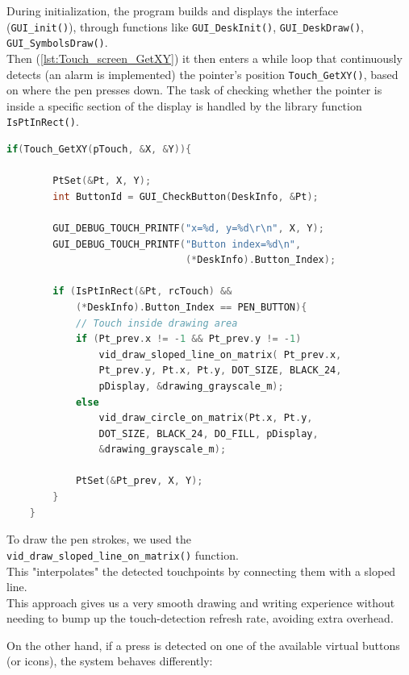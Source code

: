 \newpage
\noindent
During initialization, the program builds and displays the interface \\ (\texttt{GUI\_init()}), through functions like \texttt{GUI\_DeskInit()}, \texttt{GUI\_DeskDraw()}, \\
\texttt{GUI\_SymbolsDraw()}. \\
Then (\autoref{lst:Touch_screen_GetXY}) it then enters a while loop that continuously detects (an alarm is implemented) the pointer's position \texttt{Touch\_GetXY()}, based on where the pen presses down. The task of checking whether the pointer is inside a specific section of the display is handled by the library function  \texttt{IsPtInRect()}. 

\vspace{1em}
\begin{lstlisting}[language=C, caption={Handling the touchscreen}, label={lst:Touch_screen_GetXY}]
    if(Touch_GetXY(pTouch, &X, &Y)){
    
        PtSet(&Pt, X, Y);
        int ButtonId = GUI_CheckButton(DeskInfo, &Pt);
    
        GUI_DEBUG_TOUCH_PRINTF("x=%d, y=%d\r\n", X, Y);
        GUI_DEBUG_TOUCH_PRINTF("Button index=%d\n", 
                               (*DeskInfo).Button_Index);
    
        if (IsPtInRect(&Pt, rcTouch) &&  
            (*DeskInfo).Button_Index == PEN_BUTTON){
            // Touch inside drawing area
            if (Pt_prev.x != -1 && Pt_prev.y != -1)
                vid_draw_sloped_line_on_matrix( Pt_prev.x,
                Pt_prev.y, Pt.x, Pt.y, DOT_SIZE, BLACK_24,
                pDisplay, &drawing_grayscale_m);
            else
                vid_draw_circle_on_matrix(Pt.x, Pt.y,
                DOT_SIZE, BLACK_24, DO_FILL, pDisplay,
                &drawing_grayscale_m);
    
            PtSet(&Pt_prev, X, Y);    
        }
    }
\end{lstlisting}

\noindent
To draw the pen strokes, we used the\\
\texttt{vid\_draw\_sloped\_line\_on\_matrix()} function. \\
This "interpolates" the detected touchpoints by connecting them with a sloped line. \\
This approach gives us a very smooth drawing and writing experience without needing to bump up the touch-detection refresh rate, avoiding extra overhead.

\newpage
\noindent
On the other hand, if a press is detected on one of the available virtual buttons (or icons), the system behaves differently:

